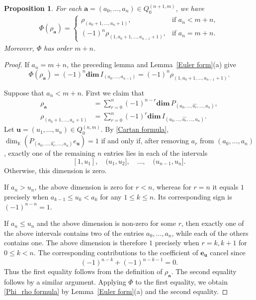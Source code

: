\documentclass[11pt,a4paper]{amsart}
\newtheorem{proposition}[theorem]{Proposition}
\theoremstyle{definition}
\numberwithin{equation}{section}
\newcommand{\0}{\mathbf{0}}
\newcommand{\dimv}{\mathbf{dim}\,}
\begin{document}
	\begin{proposition}  \label{Phi_rho}
		For each $\mathbf{a}=(a_0,\dots,a_{n})\in Q_0^{(n+1,m)}$, we have
		\begin{align}\label{Phi_rho formula}
			\Phi(\rho_{\mathbf{a}})
			=
			\begin{cases}
				\rho_{(a_0+1,\dots,a_n+1)},
				&\text{if } a_n<m+n,\\[2mm]
				(-1)^n\rho_{(1,a_0+1,\dots,a_{n-1}+1)},&\text{if } a_n=m+n.
			\end{cases}
		\end{align}
		Moreover, $\Phi$ has order $m+n$.
	\end{proposition}
	\begin{proof}
		If $a_n=m+n$, the preceding lemma and
		Lemma~\ref{Euler form}(a) give
		\[
		\Phi(\rho_{\mathbf a})
		=(-1)^n\dimv I_{(a_0,\ldots,a_{n-1})}
		=(-1)^n\rho_{(1,a_0+1,\ldots,a_{n-1}+1)}.
		\]		
		
		Suppose that $a_n<m+n$. First we claim that
		\begin{align*}
			\rho_{\mathbf a}
			&=\sum_{r=0}^n(-1)^{n-r}
			\dimv P_{(a_0,\ldots,\widehat{a_r},\ldots,a_n)},\\
			\rho_{(a_0+1,\ldots,a_n+1)}
			&=\sum_{r=0}^n(-1)^r
			\dimv I_{(a_0,\ldots,\widehat{a_r},\ldots,a_n)}.
		\end{align*}
		 Let
		$\mathbf u=(u_1,\ldots,u_n)\in Q_0^{(n,m)}$.
		By \eqref{Cartan formula},
		$		
		\dim_{\mathbb K}(P_{(a_0,\ldots,\widehat{a_r},\ldots,a_n)}
		e_{\mathbf u})=1
		$
		if and only if, after removing $a_r$ from $(a_0,\ldots,a_n)$,
		exactly one of the remaining $n$ entries lies in each of the intervals
		\[
		[1,u_1],\quad (u_1,u_2],\quad\ldots,\quad
		(u_{n-1},u_n].
		\] Otherwise, this dimension is zero.
		
		
		If $a_n>u_n$, the above dimension is zero for $r<n$, whereas for $r=n$ it equals $1$ precisely when
		$
		a_{k-1}\le u_k<a_k
		$ for any $1\le k\le n$. 
		Its corresponding sign is $(-1)^{n-n}=1$.	
				
		If $a_n\le u_n$ and
		the above dimension is non-zero
		for some $r$, then exactly one of the above intervals
		contains two of the entries $a_0,\ldots,a_n$, while each
		of the others contains one. The above dimension is therefore $1$ precisely when
		$r=k,k+1$ for $0\le k<n$. The corresponding contributions to the coefficient
		of $\mathbf e_{\mathbf u}$ cancel since
		\[
		(-1)^{n-k}+(-1)^{n-k-1}=0.
		\]
		Thus the first equality follows from the definition of
		$\rho_{\mathbf a}$. The second  equality follows by a similar argument.
		Applying $\Phi$ to the first equality, we obtain
		\eqref{Phi_rho formula} by Lemma~\ref{Euler form}(a)
		and the second equality. 
		

\end{proof}
\end{document}
